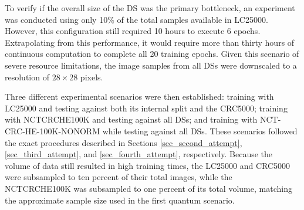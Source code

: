 To verify if the overall size of the \gls{DS} was the primary bottleneck, an experiment was conducted using only 10\% of the total samples available in \gls{LC25000}. However, this configuration still required 10 hours to execute 6 epochs. Extrapolating from this performance, it would require more than thirty hours of continuous computation to complete all 20 training epochs. Given this scenario of severe resource limitations, the image samples from all \glspl{DS} were downscaled to a resolution of $28 \times 28$ pixels.

Three different experimental scenarios were then established: training with \gls{LC25000} and testing against both its internal split and the \gls{CRC5000}; training with \gls{NCTCRCHE100K} and testing against all \glspl{DS}; and training with NCT-CRC-HE-100K-NONORM while testing against all \glspl{DS}. These scenarios followed the exact procedures described in Sections \ref{sec_second_attempt}, \ref{sec_third_attempt}, and \ref{sec_fourth_attempt}, respectively. Because the volume of data still resulted in high training times, the \gls{LC25000} and \gls{CRC5000} were subsampled to ten percent of their total images, while the \gls{NCTCRCHE100K} was subsampled to one percent of its total volume, matching the approximate sample size used in the first quantum scenario.


